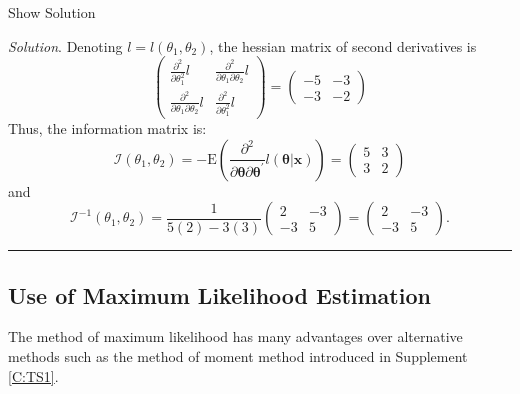 \documentclass[]{book}
\theoremstyle{definition}
\theoremstyle{definition}
\theoremstyle{definition}
\theoremstyle{remark}
\begin{document}
Show Solution

\hypertarget{SOL:S2b:COV}{}
\emph{Solution}. Denoting \(l=l(\theta_1, \theta_2)\), the hessian
matrix of second derivatives is \[\left(
\begin{array}{cc}
  \frac{ \partial ^2}{\partial \theta_1 ^2 } l & \frac{ \partial ^2}{\partial \theta_1 \partial \theta_2 } l  \\
  \frac{ \partial ^2}{\partial \theta_1 \partial \theta_2 } l & \frac{ \partial ^2}{\partial \theta_1 ^2 } l
\end{array} \right) =
\left(
\begin{array}{cc}
  -5 & -3  \\
  -3 & -2
\end{array} \right)\] Thus, the information matrix is:
\[\mathcal{I}(\theta_1, \theta_2) = -\mathrm{E} \left( \frac{ \partial^2}{\partial \boldsymbol \theta
\partial \boldsymbol \theta^{\prime}} l(\boldsymbol \theta|\mathbf{x}) \right) = \left(
\begin{array}{cc}
  5 & 3  \\
  3 & 2
\end{array} \right)\] and
\[\mathcal{I}^{-1}(\theta_1, \theta_2) = \frac{1}{5(2) - 3(3)}\left(
\begin{array}{cc}
  2 & -3  \\
  -3 & 5
\end{array} \right) = \left(
\begin{array}{cc}
  2 & -3  \\
  -3 & 5
\end{array} \right) .\]

\begin{center}\rule{0.5\linewidth}{\linethickness}\end{center}

\subsection{Use of Maximum Likelihood
Estimation}\label{use-of-maximum-likelihood-estimation}

The method of maximum likelihood has many advantages over alternative
methods such as the method of moment method introduced in Supplement
\ref{C:TS1}.
\end{document}
